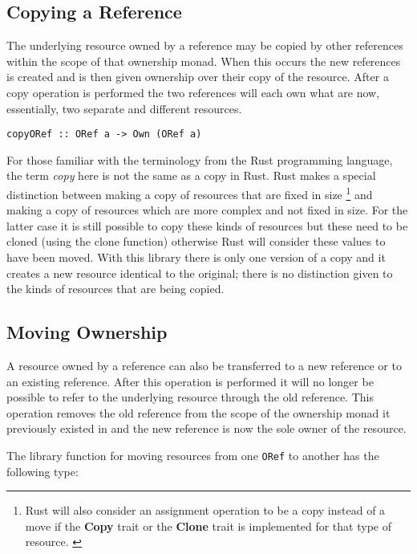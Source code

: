 \documentclass[onehalf,11pt]{beavtex}
\begin{document}
\subsection{Copying a Reference}

The underlying resource owned by a reference may be copied by other references
within the scope of that ownership monad.  When this occurs the new references is
created and is then given ownership over their copy of the resource.  After a
copy operation is performed the two references will each own what are now,
essentially, two separate and different resources.

\begin{verbatim}
copyORef :: ORef a -> Own (ORef a)
\end{verbatim}

For those familiar with the terminology from the Rust programming language, the
term \textit{copy} here is not the same as a copy in Rust. Rust makes a special
distinction between making a copy of resources that are fixed in size
\footnote{Rust will also consider an assignment operation to be a copy instead
  of a move if the \textbf{Copy} trait or the \textbf{Clone} trait is
  implemented for that type of resource. \cite{rust_book_traits}
  \cite{rust_docs_clone_trait}}
and making a copy of resources which are more complex and not fixed in size.
For the latter case it is still possible to copy these kinds of resources but these
need to be cloned (using the clone function) otherwise Rust will consider these
values to have been moved. \cite{rust_book_ownership}
With this library there is only one version of a copy and it creates a new
resource identical to the original; there is no distinction given to the kinds
of resources that are being copied.

\subsection{Moving Ownership}

A resource owned by a reference can also be transferred to a new reference or
to an existing reference. After this operation is performed it will no longer
be possible to refer to the underlying resource through the old reference. This
operation removes the old reference from the scope of the ownership monad it
previously existed in and the new reference is now the sole owner of the
resource.

The library function for moving resources from one \texttt{ORef} to another has
the following type:
\end{document}
